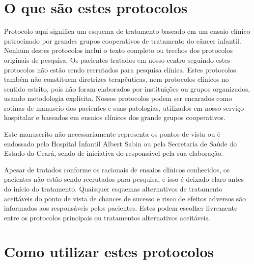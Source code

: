 \documentclass[11pt,a4paper,oldfontcommands]{memoir}
\begin{document}
\section{O que são estes protocolos}

Protocolo aqui significa um esquema de tratamento baseado em um ensaio clínico patrocinado por grandes grupos cooperativos de tratamento do câncer infantil. Nenhum destes protocolos inclui o texto completo ou trechos dos protocolos originais de pesquisa. Os pacientes tratados em nosso centro seguindo estes protocolos não estão sendo recrutados para pesquisa clínica. Estes protocolos também não constituem diretrizes terapêuticas, nem protocolos clínicos no sentido estrito, pois não foram elaborados por instituições ou grupos organizados, usando metodologia explícita. Nossos protocolos podem ser encarados como rotinas de manuseio dos pacientes e suas patologias, utilizados em nosso serviço hospitalar e baseados em ensaios clínicos dos grande grupos cooperativos.

Este manuscrito não necessariamente representa os pontos de vista ou é endossado pelo Hospital Infantil Albert Sabin ou pela Secretaria de Saúde do Estado do Ceará, sendo de iniciativa do responsável pela sua elaboração.

Apesar de tratados conforme os racionais de ensaios clínicos conhecidos, os pacientes não estão sendo recrutados para pesquisa, e isso é deixado claro antes do início do tratamento. Quaisquer esquemas alternativos de tratamento aceitáveis do ponto de vista de chances de sucesso e risco de efeitos adversos são informados aos responsáveis pelos pacientes. Estes podem escolher livremente entre os protocolos principais ou tratamentos alternativos aceitáveis.

\section{Como utilizar estes protocolos}
\end{document}

